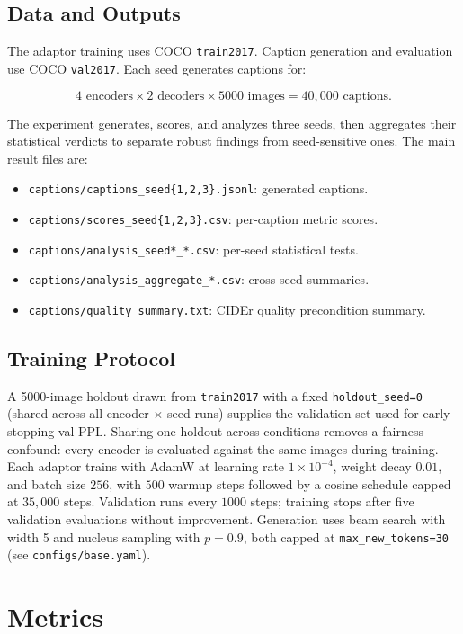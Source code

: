 \documentclass[11pt]{article}
\newcommand{\code}[1]{\texttt{#1}}
\begin{document}
\subsection{Data and Outputs}

The adaptor training uses COCO \code{train2017}. Caption generation and
evaluation use COCO \code{val2017}. Each seed generates captions for:

\[
4 \text{ encoders} \times 2 \text{ decoders} \times 5000 \text{ images}
= 40{,}000 \text{ captions}.
\]

The experiment generates, scores, and analyzes three seeds, then aggregates
their statistical verdicts to separate robust findings from seed-sensitive
ones. The main result files are:

\begin{itemize}
  \item \code{captions/captions\_seed\{1,2,3\}.jsonl}: generated captions.
  \item \code{captions/scores\_seed\{1,2,3\}.csv}: per-caption metric scores.
  \item \code{captions/analysis\_seed*\_*.csv}: per-seed statistical tests.
  \item \code{captions/analysis\_aggregate\_*.csv}: cross-seed summaries.
  \item \code{captions/quality\_summary.txt}: CIDEr quality precondition summary.
\end{itemize}

\subsection{Training Protocol}

A 5000-image holdout drawn from \code{train2017} with a fixed
\code{holdout\_seed=0} (shared across all encoder \(\times\) seed runs) supplies
the validation set used for early-stopping val PPL. Sharing one holdout across
conditions removes a fairness confound: every encoder is evaluated against the
same images during training. Each adaptor trains with AdamW at learning rate \(1\!\times\!10^{-4}\),
weight decay \(0.01\), and batch size \(256\), with \(500\) warmup steps
followed by a cosine schedule capped at \(35{,}000\) steps. Validation
runs every \(1000\) steps; training stops after five validation evaluations
without improvement. Generation uses beam search with width 5 and nucleus
sampling with \(p=0.9\), both capped at \code{max\_new\_tokens=30}
(see \code{configs/base.yaml}).

\section{Metrics}
\end{document}
